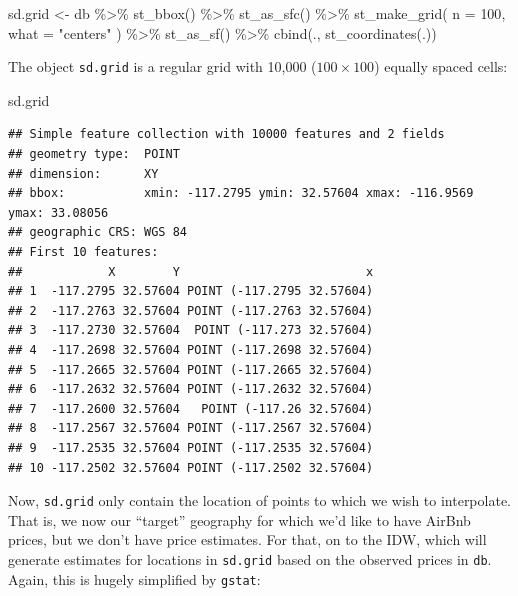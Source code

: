 \documentclass[
]{book}
\newenvironment{Shaded}{\begin{snugshade}}{\end{snugshade}}
\newcommand{\AttributeTok}[1]{\textcolor[rgb]{0.77,0.63,0.00}{#1}}
\newcommand{\DecValTok}[1]{\textcolor[rgb]{0.00,0.00,0.81}{#1}}
\newcommand{\FunctionTok}[1]{\textcolor[rgb]{0.00,0.00,0.00}{#1}}
\newcommand{\NormalTok}[1]{#1}
\newcommand{\OtherTok}[1]{\textcolor[rgb]{0.56,0.35,0.01}{#1}}
\newcommand{\SpecialCharTok}[1]{\textcolor[rgb]{0.00,0.00,0.00}{#1}}
\newcommand{\StringTok}[1]{\textcolor[rgb]{0.31,0.60,0.02}{#1}}
\begin{document}
\begin{Shaded}
\begin{Highlighting}[]
\NormalTok{sd.grid }\OtherTok{\textless{}{-}}\NormalTok{ db }\SpecialCharTok{\%\textgreater{}\%}
  \FunctionTok{st\_bbox}\NormalTok{() }\SpecialCharTok{\%\textgreater{}\%}
  \FunctionTok{st\_as\_sfc}\NormalTok{() }\SpecialCharTok{\%\textgreater{}\%}
  \FunctionTok{st\_make\_grid}\NormalTok{(}
    \AttributeTok{n =} \DecValTok{100}\NormalTok{,}
    \AttributeTok{what =} \StringTok{"centers"}
\NormalTok{  ) }\SpecialCharTok{\%\textgreater{}\%}
  \FunctionTok{st\_as\_sf}\NormalTok{() }\SpecialCharTok{\%\textgreater{}\%}
  \FunctionTok{cbind}\NormalTok{(., }\FunctionTok{st\_coordinates}\NormalTok{(.))}
\end{Highlighting}
\end{Shaded}

The object \texttt{sd.grid} is a regular grid with 10,000 (\(100 \times 100\)) equally spaced cells:

\begin{Shaded}
\begin{Highlighting}[]
\NormalTok{sd.grid}
\end{Highlighting}
\end{Shaded}

\begin{verbatim}
## Simple feature collection with 10000 features and 2 fields
## geometry type:  POINT
## dimension:      XY
## bbox:           xmin: -117.2795 ymin: 32.57604 xmax: -116.9569 ymax: 33.08056
## geographic CRS: WGS 84
## First 10 features:
##            X        Y                          x
## 1  -117.2795 32.57604 POINT (-117.2795 32.57604)
## 2  -117.2763 32.57604 POINT (-117.2763 32.57604)
## 3  -117.2730 32.57604  POINT (-117.273 32.57604)
## 4  -117.2698 32.57604 POINT (-117.2698 32.57604)
## 5  -117.2665 32.57604 POINT (-117.2665 32.57604)
## 6  -117.2632 32.57604 POINT (-117.2632 32.57604)
## 7  -117.2600 32.57604   POINT (-117.26 32.57604)
## 8  -117.2567 32.57604 POINT (-117.2567 32.57604)
## 9  -117.2535 32.57604 POINT (-117.2535 32.57604)
## 10 -117.2502 32.57604 POINT (-117.2502 32.57604)
\end{verbatim}

Now, \texttt{sd.grid} only contain the location of points to which we wish to interpolate. That is, we now our ``target'' geography for which we'd like to have AirBnb prices, but we don't have price estimates. For that, on to the IDW, which will generate estimates for locations in \texttt{sd.grid} based on the observed prices in \texttt{db}. Again, this is hugely simplified by \texttt{gstat}:
\end{document}
